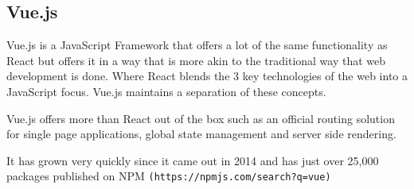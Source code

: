 \subsection{Vue.js}

Vue.js is a JavaScript Framework that offers a lot of the same functionality as React but offers it in a way that is more akin to the traditional way that web development is done. Where React blends the 3 key technologies of the web into a JavaScript focus. Vue.js maintains a separation of these concepts.

Vue.js offers more than React out of the box such as an official routing solution for single page applications, global state management and server side rendering.

It has grown very quickly since it came out in 2014 and has just over 25,000 packages published on NPM \texttt{(https://npmjs.com/search?q=vue)}

\pagebreak
